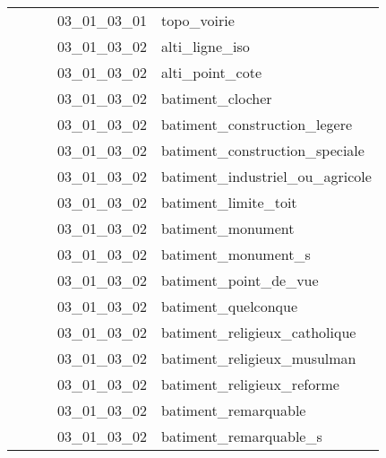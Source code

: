 \documentclass[12pt,titlepage,oneside]{book}
\begin{document}
\begin{supertabular}{|p{7.5cm}|p{7.5cm}|p{7.5cm}|c|p{10cm}|}
                   &                    &                    & 03\_01\_03\_01 & topo\_voirie\\
                   &                    &                    & 03\_01\_03\_02 & alti\_ligne\_iso\\
                   &                    &                    & 03\_01\_03\_02 & alti\_point\_cote\\
                   &                    &                    & 03\_01\_03\_02 & batiment\_clocher\\
                   &                    &                    & 03\_01\_03\_02 & batiment\_construction\_legere\\
                   &                    &                    & 03\_01\_03\_02 & batiment\_construction\_speciale\\
                   &                    &                    & 03\_01\_03\_02 & batiment\_industriel\_ou\_agricole\\
                   &                    &                    & 03\_01\_03\_02 & batiment\_limite\_toit\\
                   &                    &                    & 03\_01\_03\_02 & batiment\_monument\\
                   &                    &                    & 03\_01\_03\_02 & batiment\_monument\_s\\
                   &                    &                    & 03\_01\_03\_02 & batiment\_point\_de\_vue\\
                   &                    &                    & 03\_01\_03\_02 & batiment\_quelconque\\
                   &                    &                    & 03\_01\_03\_02 & batiment\_religieux\_catholique\\
                   &                    &                    & 03\_01\_03\_02 & batiment\_religieux\_musulman\\
                   &                    &                    & 03\_01\_03\_02 & batiment\_religieux\_reforme\\
                   &                    &                    & 03\_01\_03\_02 & batiment\_remarquable\\
                   &                    &                    & 03\_01\_03\_02 & batiment\_remarquable\_s\\

\end{supertabular}
\end{document}
